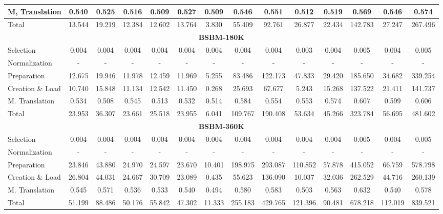 \begin{table}[t]
{\begin{tabular}{l|c|c|c|c|c|c|c|c|c|c|c|c|c}
M, Translation & 0.540 & 0.525 & 0.516 & 0.509 & 0.527 & 0.509 & 0.546 & 0.551 & 0.512 & 0.519 & 0.569 & 0.546 & 0.574 \\ \hline
Total & 13.544 & 19.219 & 12.384 & 12.602 & 13.764 & 3.830 & 55.409 & 92.761 & 26.877 & 22.434 & 142.783 & 27.247 & 267.496 \\ \hline
\multicolumn{14}{c}{\textbf{BSBM-180K}} \\ \hline
Selection & 0.004 & 0.004 & 0.004 & 0.004 & 0.004 & 0.004 & 0.004 & 0.004 & 0.003 & 0.004 & 0.005 & 0.004 & 0.005 \\ \hline
Normalization & - & - & - & - & - & - & - & - & - & - & - & - & - \\ \hline
Preparation & 12.675 & 19.946 & 11.978 & 12.459 & 11.969 & 5.255 & 83.486 & 122.173 & 47.833 & 29.420 & 185.650 & 34.682 & 339.254 \\ \hline
Creation \& Load & 10.740 & 15.848 & 11.134 & 12.542 & 11.450 & 0.268 & 25.693 & 67.677 & 5.243 & 15.268 & 137.522 & 21.411 & 141.737 \\ \hline
M. Translation & 0.534 & 0.508 & 0.545 & 0.513 & 0.532 & 0.514 & 0.584 & 0.554 & 0.553 & 0.574 & 0.607 & 0.599 & 0.606 \\ \hline
Total & 23.953 & 36.307 & 23.661 & 25.518 & 23.955 & 6.041 & 109.767 & 190.408 & 53.634 & 45.266 & 323.784 & 56.695 & 481.602 \\ \hline
\multicolumn{14}{c}{\textbf{BSBM-360K}} \\ \hline
Selection & 0.004 & 0.004 & 0.004 & 0.004 & 0.004 & 0.004 & 0.004 & 0.004 & 0.004 & 0.004 & 0.005 & 0.004 & 0.005 \\ \hline
Normalization & - & - & - & - & - & - & - & - & - & - & - & - & - \\ \hline
Preparation & 23.846 & 43.880 & 24.970 & 24.597 & 23.670 & 10.401 & 198.975 & 293.087 & 110.852 & 57.878 & 415.052 & 66.759 & 578.798 \\ \hline
Creation \& Load & 26.804 & 44.031 & 24.667 & 30.709 & 23.089 & 0.435 & 55.623 & 136.090 & 10.037 & 32.036 & 262.529 & 44.716 & 260.139 \\ \hline
M. Translation & 0.545 & 0.571 & 0.536 & 0.533 & 0.540 & 0.494 & 0.580 & 0.583 & 0.503 & 0.563 & 0.632 & 0.540 & 0.578 \\ \hline
Total & 51.199 & 88.486 & 50.176 & 55.842 & 47.302 & 11.333 & 255.183 & 429.765 & 121.396 & 90.481 & 678.218 & 112.019 & 839.521 \\ \hline
\end{tabular}%
}
\end{table}

